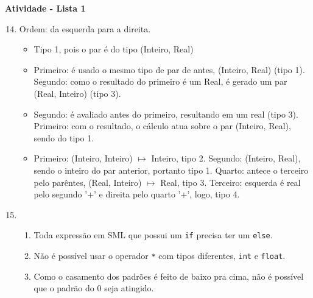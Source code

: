 \documentclass{article}
\author{Igor Lacerda Faria da Silva}
\begin{document}
\pagestyle{fancy}

\begin{center}
    \textbf{Atividade - Lista 1}
\end{center}

\begin{enumerate}
\setcounter{enumi}{13}
  \item Ordem: da esquerda para a direita.
    \begin{itemize}
      \item Tipo 1, pois o par é do tipo (Inteiro, Real)
      \item  Primeiro: é usado o mesmo tipo de par de antes, (Inteiro, Real) (tipo 1). Segundo: como o resultado do primeiro é um Real, é gerado um par (Real, Inteiro) (tipo 3).
      \item Segundo: é avaliado antes do primeiro, resultando em um real (tipo 3). Primeiro: com o resultado, o cálculo atua sobre o par (Inteiro, Real), sendo do tipo 1.
      \item Primeiro: (Inteiro, Inteiro) $\mapsto$ Inteiro, tipo 2. Segundo: (Inteiro, Real), sendo o inteiro do par anterior, portanto tipo 1. Quarto: antece o terceiro pelo parêntes, (Real, Inteiro) $\mapsto$ Real, tipo 3. Terceiro: esquerda é real pelo segundo '+' e direita pelo quarto '+', logo, tipo 4.
    \end{itemize}
  \item 
    \begin{enumerate}
      \item Toda expressão em SML que possui um \texttt{if} precisa ter um \texttt{else}.
      \item Não é possível usar o operador \texttt{*} com tipos diferentes, \texttt{int} e \texttt{float}.
      \item Como o casamento dos padrões é feito de baixo pra cima, não é possível que o padrão do 0 seja atingido.
    \end{enumerate}
\end{enumerate}
\end{document}
